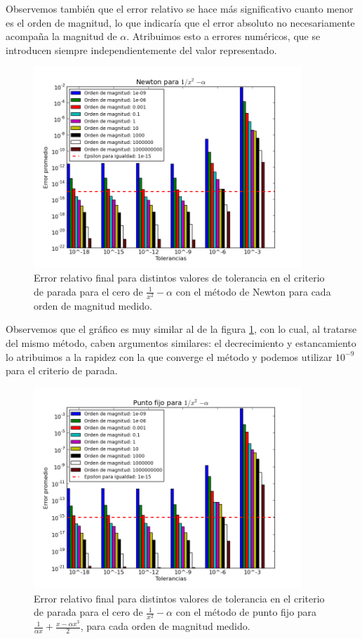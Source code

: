 Observemos también que el error relativo se hace más significativo cuanto menor es el orden de magnitud, lo que indicaría que el error absoluto no necesariamente acompaña la magnitud de $\alpha$. Atribuimos esto a errores numéricos, que se introducen siempre independientemente del valor representado.


\begin{figure}[H]
  \centering
    \includegraphics[width=0.9\textwidth]{../data/NewtonE.png}
    \caption{Error relativo final para distintos valores de tolerancia en el criterio de parada para el cero de $\frac{1}{x^2} - \alpha$ con el método de Newton para cada orden de magnitud medido.}
    \label{paradaMet1}
\end{figure}

Observemos que el gráfico es muy similar al de la figura \ref{paradaMet1}, con lo cual, al tratarse del mismo método, caben argumentos similares: el decrecimiento y estancamiento lo atribuimos a la rapidez con la que converge el método y podemos utilizar $10^{-9}$ para el criterio de parada.

\begin{figure}[H]
  \centering
    \includegraphics[width=0.9\textwidth]{../data/NewtonPuntoFijo.png}
    \caption{Error relativo final para distintos valores de tolerancia en el criterio de parada para el cero de $\frac{1}{x^2} - \alpha$ con el método de punto fijo para $\frac{1}{\alpha x} + \frac{x - \alpha x^3}{2}$, para cada orden de magnitud medido.}
    \label{paradaMet2}
\end{figure}

